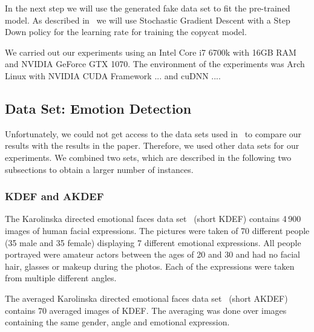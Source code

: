 \documentclass[a4paper,11pt]{article}
\begin{document}
    In the next step we will use the generated fake data set to fit the pre-trained model.
    As described in~\cite{copycat} we will use Stochastic Gradient Descent with a Step Down policy for the learning rate for training the copycat model. 
    
    We carried out our experiments using an Intel Core i7 6700k with 16GB RAM and NVIDIA GeForce GTX 1070. The environment of the experiments was Arch Linux with NVIDIA CUDA Framework ... and cuDNN .... \todo{!}
    
    \subsection{Data Set: Emotion Detection}
        Unfortunately, we could not get access to the data sets used in~\cite{copycat} to compare our results with the results in the paper. Therefore, we used other data sets for our experiments. We combined two sets, which are described in the following two subsections to obtain a larger number of instances.
        
        \subsubsection{KDEF and AKDEF}
            The Karolinska directed emotional faces data set~\cite{kdef} (short KDEF) contains 4\,900 images of human facial expressions. The pictures were taken of 70 different people (35 male and 35 female) displaying 7 different emotional expressions. All people portrayed were amateur actors between the ages of 20 and 30 and had no facial hair, glasses or makeup during the photos. Each of the expressions were taken from multiple different angles. 
            
            The averaged Karolinska directed emotional faces data set~\cite{kdef} (short AKDEF) contains $70$ averaged images of KDEF. The averaging was done over images containing the same gender, angle and emotional expression.
            
\end{document}
